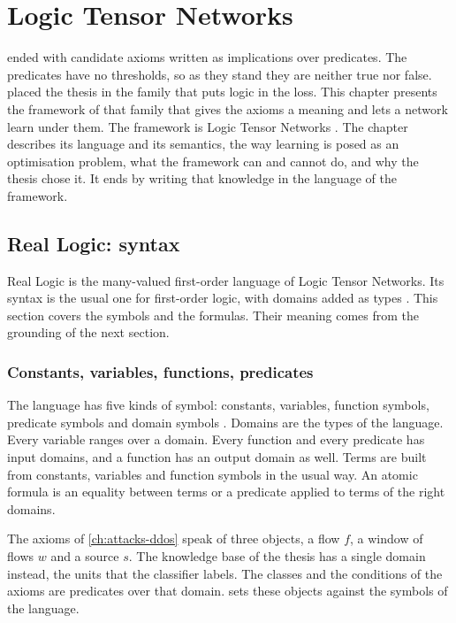 \chapter{Logic Tensor Networks}
\label{ch:ltn}

 ended with candidate axioms written as implications
over predicates. The predicates have no thresholds, so as they stand they are
neither true nor false.  placed the thesis in the
family that puts logic in the loss. This chapter presents the framework of
that family that gives the axioms a meaning and lets a network learn under
them. The framework is Logic Tensor
Networks \citep{badreddine2022ltn}. The chapter describes its language and its
semantics, the way learning is posed as an optimisation problem, what the
framework can and cannot do, and why the thesis chose it. It ends by writing
that knowledge in the language of the framework.

\section{Real Logic: syntax}
\label{sec:real-logic-syntax}

Real Logic is the many-valued first-order language of Logic Tensor Networks.
Its syntax is the usual one for first-order logic, with domains added as
types \citep{badreddine2022ltn}. This section covers the symbols and the
formulas. Their meaning comes from the grounding of the next section.

\subsection{Constants, variables, functions, predicates}
\label{sec:rl-symbols}

The language has five kinds of symbol: constants, variables, function symbols,
predicate symbols and domain symbols \citep{badreddine2022ltn}. Domains are
the types of the language. Every variable ranges over a domain. Every function
and every predicate has input domains, and a function has an output domain as
well. Terms are built from constants, variables and function symbols in the
usual way. An atomic formula is an equality between terms or a predicate
applied to terms of the right domains.

The axioms of \cref{ch:attacks-ddos} speak of three objects, a flow $f$, a
window of flows $w$ and a source $s$. The knowledge base of the thesis has a
single domain instead, the units that the classifier labels. The classes and
the conditions of the axioms are predicates over that domain.
 sets these objects against the symbols of the
language.

